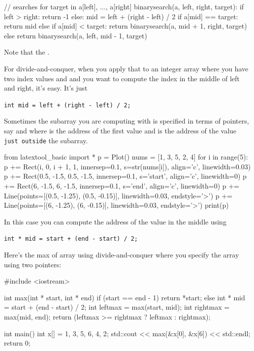 \begin{console}
// searches for target in a[left], ..., a[right]
binarysearch(a, left, right, target):
    if left > right:
        return -1
    else:
        mid = left + (right - left) / 2
        if a[mid] == target:
            return mid
        else if a[mid] < target:
            return binarysearch(a, mid + 1, right, target)
        else
            return binarysearch(a, left, mid - 1, target)
\end{console}

Note that the .


For divide-and-conquer, when you apply that to an integer array where
you have two index values  and 
and you want to compute the index in the middle of left and right, it's
easy. It's just

\verb!int mid = left + (right - left) / 2;!

Sometimes the subarray you are computing with is specified in terms of
pointers, say  and  where
 is the address of the first value and
 is the address of the value \texttt{just outside} the
subarray.

\begin{python}
from latextool_basic import *
p = Plot()
nums = [1, 3, 5, 2, 4]
for i in range(5):
    p += Rect(i, 0, i + 1, 1, innersep=0.1, s=str(nums[i]), align='c', linewidth=0.03)
p += Rect(0.5, -1.5, 0.5, -1.5, innersep=0.1, s='start', align='c', linewidth=0)
p += Rect(6, -1.5, 6, -1.5, innersep=0.1, s='end', align='c', linewidth=0)
p += Line(points=[(0.5, -1.25), (0.5, -0.15)], linewidth=0.03, endstyle='>')
p += Line(points=[(6, -1.25), (6, -0.15)], linewidth=0.03, endstyle='>')
print(p)
\end{python}

In this case you can compute the address of the value in the middle
using

\verb!int * mid = start + (end - start) / 2;!

Here's the max of array using divide-and-conquer where you specify the
array using two pointers:

\begin{consolethree}[escapeinside=||]
#include <iostream>

int max(int * start, int * end)
{
    if (start == end - 1)
    {
        return *start;
    }
    else
    {
        int * mid = start + (end - start) / 2;
        int leftmax = max(start, mid);
        int rightmax = max(mid, end);
        return (leftmax >= rightmax ? leftmax : rightmax);
    }
}

int main()
{
    int x[] = {1, 3, 5, 6, 4, 2};
    std::cout << max(&x[0], &x[6]) << std::endl;
    return 0;
}
\end{consolethree}






